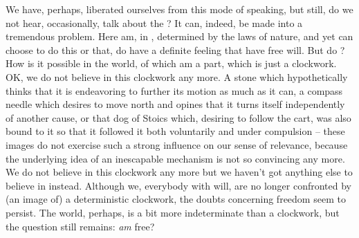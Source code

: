 We have, perhaps, liberated ourselves from this mode of speaking, but still, do
we not hear, occasionally, talk about the ?  It can, indeed, be made into a tremendous problem.  Here  am, in
, determined by the laws of nature, and yet  can choose to
do this or that,  do have a definite feeling that  have free will.
But do ?  How is it possible in the world, of which  am a part,
which is just a clockwork.  OK, we do not believe in this clockwork any more.  A
stone which hypothetically thinks that it is endeavoring to further its motion
as much as it can, a compass needle which desires to move north and opines that
it turns itself independently of another cause, or that dog of Stoics which,
desiring to follow the cart, was also bound to it so that it followed it both
voluntarily and under compulsion -- these images do
not exercise 
such a strong influence on our sense of relevance, because the underlying idea
of an inescapable mechanism is not so convincing any more.
 We do not believe in this clockwork any more but we haven't got
anything else to believe in instead. Although we, everybody with  will, are no
longer confronted by (an image of) a deterministic clockwork, the doubts
concerning freedom seem to persist. 
The world, perhaps, is a bit more indeterminate than a clockwork, but the
question still remains: {\em am}  free?

